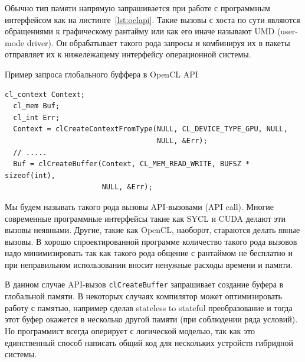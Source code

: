 Обычно тип памяти напрямую запрашивается при работе с программным интерфейсом как на листинге~\cref{lst:oclapi}. Такие вызовы с хоста по сути являются обращениями к графическому рантайму или как его иначе называют UMD (user-mode driver). Он обрабатывает такого рода запросы и комбинируя их в пакеты отправляет их к нижележащему интерфейсу операционной системы.


\begin{ListingEnv}[!h]
    \captiondelim{ } 
    \caption{Пример запроса глобального буффера в OpenCL API}\label{lst:oclapi}
    \begin{lstlisting}[language={[ISO]C++}]
  cl_context Context;
  cl_mem Buf;
  cl_int Err;
  Context = clCreateContextFromType(NULL, CL_DEVICE_TYPE_GPU, NULL, 
                                    NULL, &Err);
  // .....
  Buf = clCreateBuffer(Context, CL_MEM_READ_WRITE, BUFSZ * sizeof(int), 
                       NULL, &Err);
    \end{lstlisting}
\end{ListingEnv}

Мы будем называть такого рода вызовы API-вызовами (API call). Многие современные программные интерфейсы такие как SYCL и CUDA делают эти вызовы неявными. Другие, такие как OpenCL, наоборот, стараются делать явные вызовы. В хорошо спроектированной программе количество такого рода вызовов надо минимизировать так как такого рода общение с рантаймом не бесплатно и при неправильном использовании вносит ненужные расходы времени и памяти.

В данном случае API-вызов \lstinline!clCreateBuffer! запрашивает создание буфера в глобальной памяти. В некоторых случаях компилятор может оптимизировать работу с памятью, например сделав stateless to stateful преобразование и тогда этот буфер окажется в несколько другой памяти (при соблюдении ряда условий). Но программист всегда оперирует с логической моделью, так как это единственный способ написать общий код для нескольких устройств гибридной системы.

